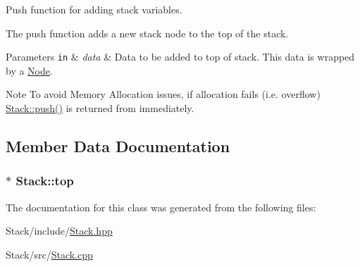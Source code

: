 \-Push function for adding stack variables. 

\-The push function adds a new stack node to the top of the stack.


\begin{DoxyParams}[1]{\-Parameters}
\mbox{\tt in}  & {\em data} & \-Data to be added to top of stack. \-This data is wrapped by a \hyperlink{classNode}{\-Node}.\\
\hline
\end{DoxyParams}
\begin{DoxyNote}{\-Note}
\-To avoid \-Memory \-Allocation issues, if allocation fails (i.\-e. overflow) \hyperlink{classStack_acaf50a3a40fc274ee1392cce00b02979}{\-Stack\-::push()} is returned from immediately. 
\end{DoxyNote}


\subsection{\-Member \-Data \-Documentation}
\hypertarget{classStack_a953b2d23babaa0952c62a795b6e678fd}{
\subsubsection[{top}]{$\ast$ {\bf \-Stack\-::top}}}\label{classStack_a953b2d23babaa0952c62a795b6e678fd}


\-The documentation for this class was generated from the following files\-:\begin{DoxyCompactItemize}
\item 
\-Stack/include/\hyperlink{Stack_8hpp}{\-Stack.\-hpp}\item 
\-Stack/src/\hyperlink{Stack_8cpp}{\-Stack.\-cpp}\end{DoxyCompactItemize}
